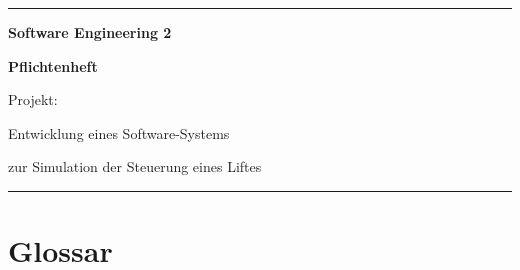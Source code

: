 

\begin{titlepage}
	\vspace*{\fill}

	\rule{\textwidth}{0.25pt}

	\vspace*{1cm}

	\begin{singlespace}
		\begin{center}	\Large	\bfseries
			Software Engineering 2
		\end{center}
	\end{singlespace}

	\vspace{1em}

	\begin{singlespace}
		\begin{center}	\Large \bfseries
		Pflichtenheft
		
		\vspace{2em}	\large
		Projekt:
		
		Entwicklung eines Software-Systems
		
		zur Simulation der Steuerung eines Liftes
		\end{center}
	\end{singlespace}

	\vspace*{5cm}

	\rule{\textwidth}{0.25pt}

	\vspace*{\fill}
\end{titlepage}


\tableofcontents



\chapter{Glossar}
\glsaddall %
\printglossary[title=Allgemeiner Glossar, toctitle=Allgemeiner Glossar, type=allg]

\printglossary[title=Projektspezifischer Glossar, toctitle=Projektspezifischer Glossar]


